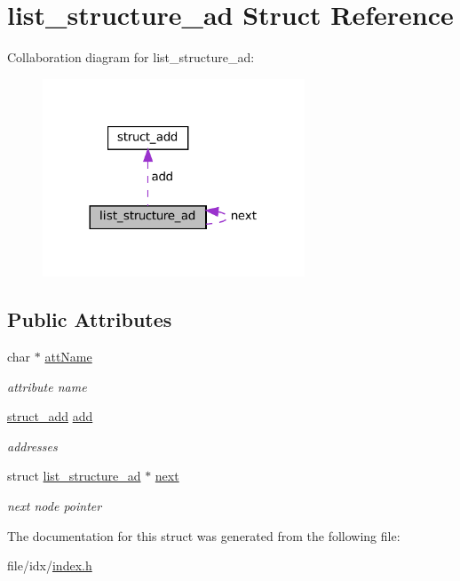 \hypertarget{structlist__structure__ad}{}\section{list\+\_\+structure\+\_\+ad Struct Reference}
\label{structlist__structure__ad}


Collaboration diagram for list\+\_\+structure\+\_\+ad\+:\nopagebreak
\begin{figure}[H]
\begin{center}
\leavevmode
\includegraphics[width=221pt]{structlist__structure__ad__coll__graph}
\end{center}
\end{figure}
\subsection*{Public Attributes}
\begin{DoxyCompactItemize}
\item 
\mbox{\label{structlist__structure__ad_a62a7324920a37f1388600ab02c0fd841}} 
char $\ast$ \hyperlink{structlist__structure__ad_a62a7324920a37f1388600ab02c0fd841}{att\+Name}
\begin{DoxyCompactList}\small\item\em attribute name \end{DoxyCompactList}\item 
\mbox{\label{structlist__structure__ad_a0bb6169985f5e52444aa344508cce673}} 
\hyperlink{structstruct__add}{struct\+\_\+add} \hyperlink{structlist__structure__ad_a0bb6169985f5e52444aa344508cce673}{add}
\begin{DoxyCompactList}\small\item\em addresses \end{DoxyCompactList}\item 
\mbox{\label{structlist__structure__ad_a5c8aaf39dab4c40186470c6ea0464a23}} 
struct \hyperlink{structlist__structure__ad}{list\+\_\+structure\+\_\+ad} $\ast$ \hyperlink{structlist__structure__ad_a5c8aaf39dab4c40186470c6ea0464a23}{next}
\begin{DoxyCompactList}\small\item\em next node pointer \end{DoxyCompactList}\end{DoxyCompactItemize}


The documentation for this struct was generated from the following file\+:\begin{DoxyCompactItemize}
\item 
file/idx/\hyperlink{index_8h}{index.\+h}\end{DoxyCompactItemize}
